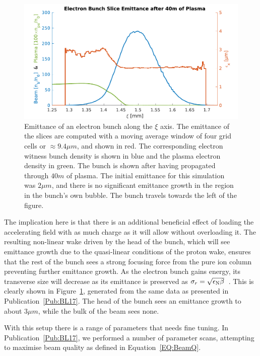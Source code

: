 \begin{figure}[hbt]
    \centering
    \includegraphics[width=0.8125\linewidth]{figures/40mSliceEmittance}
    \caption{\label{Fig:SimA:BL17Emitt}
        Emittance of an electron bunch along the $\xi$ axis.
        The emittance of the slices are computed with a moving average window of four grid cells or $\approx 9.4\unit{\mu m}$, and shown in red.
        The corresponding electron witness bunch density is shown in blue and the plasma electron density in green.
        The bunch is shown after having propagated through $40\unit{m}$ of plasma.
        The initial emittance for this simulation was $2\unit{\mu m}$, and there is no significant emittance growth in the region in the bunch's own bubble.
        The bunch travels towards the left of the figure.
    }
\end{figure}

The implication here is that there is an additional beneficial effect of loading the accelerating field with as much charge as it will allow without overloading it.
The resulting non-linear wake driven by the head of the bunch, which will see emittance growth due to the quasi-linear conditions of the proton wake, ensures that the rest of the bunch sees a strong focusing force from the pure ion column preventing further emittance growth.
As the electron bunch gains energy, its transverse size will decrease as its emittance is preserved as $\sigma_{r} = \sqrt{\epsilon_{\mathrm{N}}\beta}$~\cite{wille:2001}.
This is clearly shown in Figure~\ref{Fig:SimA:BL17Emitt}, generated from the same data as presented in Publication~\ref{Pub:BL17}.
The head of the bunch sees an emittance growth to about $3\unit{\mu m}$, while the bulk of the beam sees none.

With this setup there is a range of parameters that needs fine tuning.
In Publication~\ref{Pub:BL17}, we performed a number of parameter scans, attempting to maximise beam quality as defined in Equation~\ref{EQ:BeamQ}.

